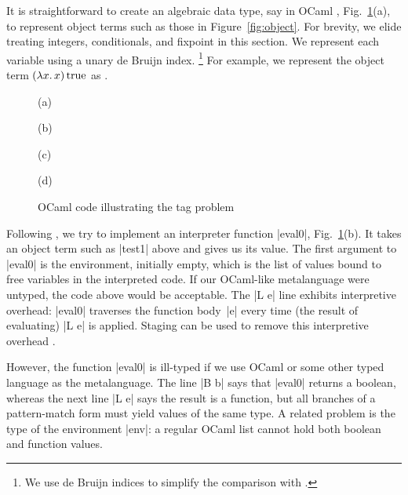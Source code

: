 It is straightforward to create an algebraic data type, say in OCaml%
\ifshort, Fig.~\ref{fig:tag-problem}(a)\fi, to
represent object terms such as those in Figure~\ref{fig:object}.
For brevity, we elide treating integers, conditionals, and fixpoint in
this section.
\ifshort\else{}\fi
We represent each variable using a unary de Bruijn index.%
\footnote{We use de Bruijn indices to simplify the comparison with
\citet{WalidICFP02}.}
For example, we represent the object term $(\mathopen{\lambda\mathord{x}.\,}x)\mathinner{\mathrm{true}}$ as
\ifshort {}.\else {}\fi

\ifshort
\begin{figure}
%
(a) 

\smallskip
(b) 

\smallskip
(c) 

\smallskip
(d) 

\medskip
\caption{OCaml code illustrating the tag problem}
\label{fig:tag-problem}
\end{figure}
\fi

\noindent Following \citep{WalidICFP02},
we try to implement an interpreter function |eval0|\ifshort,
Fig.~\ref{fig:tag-problem}(b)\fi. It takes
an object term such as |test1| above and gives us its value.
The first argument to |eval0| is the environment, initially empty,
which is the list of values bound to free variables in the
interpreted code.
\ifshort\else{}\fi
If our OCaml-like metalanguage were untyped, the code above would be 
acceptable.
The |L e| line exhibits interpretive overhead:
|eval0| traverses the function body~|e| every time (the result of
evaluating) |L e| is applied. Staging can be used to remove this
interpretive overhead \citep[\S1.1--2]{WalidICFP02}.

However, the function |eval0| is ill-typed
if we use OCaml or some other typed language as the metalanguage.
The line |B b|
says that |eval0| returns a boolean, whereas the next line |L e| says
the result is a function, but all branches of a pattern-match form must
yield values of the same type. 
A related problem is the type of the environment |env|: a regular
OCaml list cannot hold both boolean and function values. 

